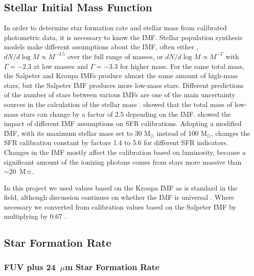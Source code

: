 \subsection{Stellar Initial Mass Function}
\label{sec: imf}
In order to determine star formation rate and stellar mass from calibrated photometric data, it is necessary to know the IMF. 
Stellar population synthesis models make different assumptions about the IMF, often either \citet{Salpeter55},
$ dN / d \log M \propto M^{-3.5 }$ over the full range of masses, or 
\citet{Kroupa01} $ dN / d \log M \propto M^{-\Gamma }$ 
with $\Gamma=-2.3$ at low masses and  $\Gamma=-3.3$ for higher mass.
For the same total mass, the Salpeter and Kroupa IMFs produce almost the same amount of high-mass stars, but the Salpeter IMF produces more low-mass stars. Different predictions of the number of stars between various IMFs are one of the main uncertainty sources in the calculation of the stellar mass \citep{Eskew12,Brewer12}. \citet{Eskew12} showed that the total mass of low-mass stars can change by a factor of 2.5 depending on the IMF.
\citet{Calzetti13} showed the impact of different IMF assumptions on SFR calibrations. Adopting a modified \citet{Kroupa01} IMF, with its maximum stellar mass set to 30 M$_{\odot}$ instead of 100 M$_{\odot}$, changes the SFR calibration constant by factors 1.4 to 5.6 for different SFR indicators. Changes in the IMF mostly affect the calibration based on \halpha luminosity, because a significant amount of the ionizing photons comes from stars more massive than $\sim 20$~M$\sun$.

In this project we used values based on the Kroupa IMF as is standard in the field, although discussion continues on whether the IMF is universal \citep{Bastin10}. Where necessary we converted from calibration values based on the Salpeter IMF by multiplying by 0.67  \citep{Madau14}.



\subsection{Star Formation Rate}
\label{sec:sfr}
\subsubsection{FUV plus 24~$\mu$m Star Formation Rate}

